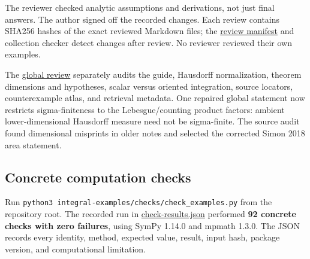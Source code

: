 \documentclass[
  11pt,
]{article}
\begin{document}
The reviewer checked analytic assumptions and derivations, not just
final answers. The author signed off the recorded changes. Each review
contains SHA256 hashes of the exact reviewed Markdown files; the
\href{https://github.com/Drsunflowerherbert/Codex-for-Math/tree/codex/integral-examples-2026-10-15/integral-examples/reviews/review-manifest.json}{review
manifest} and collection checker detect changes after review. No
reviewer reviewed their own examples.

The
\href{https://github.com/Drsunflowerherbert/Codex-for-Math/tree/codex/integral-examples-2026-10-15/integral-examples/reviews/global-review.md}{global
review} separately audits the guide, Hausdorff normalization, theorem
dimensions and hypotheses, scalar versus oriented integration, source
locators, counterexample atlas, and retrieval metadata. One repaired
global statement now restricts sigma-finiteness to the Lebesgue/counting
product factors: ambient lower-dimensional Hausdorff measure need not be
sigma-finite. The source audit found dimensional misprints in older
notes and selected the corrected Simon 2018 area statement.

\subsection{Concrete computation
checks}\label{concrete-computation-checks}

Run \texttt{python3\ integral-examples/checks/check\_examples.py} from
the repository root. The recorded run in
\href{https://github.com/Drsunflowerherbert/Codex-for-Math/tree/codex/integral-examples-2026-10-15/integral-examples/checks/check-results.json}{check-results.json}
performed \textbf{92 concrete checks with zero failures}, using SymPy
1.14.0 and mpmath 1.3.0. The JSON records every identity, method,
expected value, result, input hash, package version, and computational
limitation.
\end{document}
